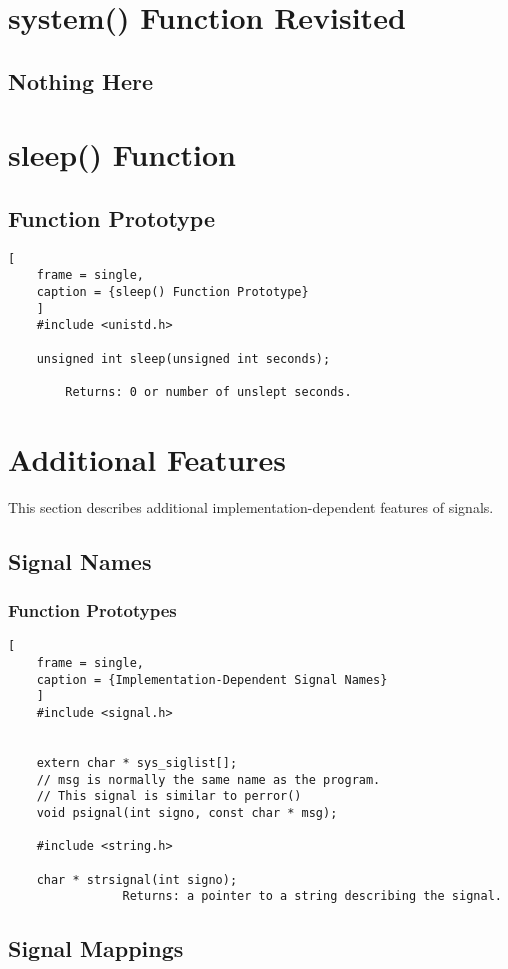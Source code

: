 \documentclass{article}
\begin{document}
\section{\textbf{system()} Function Revisited}
\subsection{Nothing Here}

\section{\textbf{sleep()} Function}
\subsection{Function Prototype}
\begin{lstlisting}[
    frame = single,
    caption = {sleep() Function Prototype}
    ]
    #include <unistd.h>

    unsigned int sleep(unsigned int seconds);

        Returns: 0 or number of unslept seconds.
\end{lstlisting}


\section{Additional Features}
This section describes additional implementation-dependent features of signals.
\subsection{Signal Names}
\subsubsection{Function Prototypes}
\begin{lstlisting}[
    frame = single,
    caption = {Implementation-Dependent Signal Names}
    ]
    #include <signal.h>


    extern char * sys_siglist[];
    // msg is normally the same name as the program.
    // This signal is similar to perror()
    void psignal(int signo, const char * msg);

    #include <string.h>

    char * strsignal(int signo);
                Returns: a pointer to a string describing the signal.
\end{lstlisting}
\clearpage
\subsection{Signal Mappings}
\end{document}
